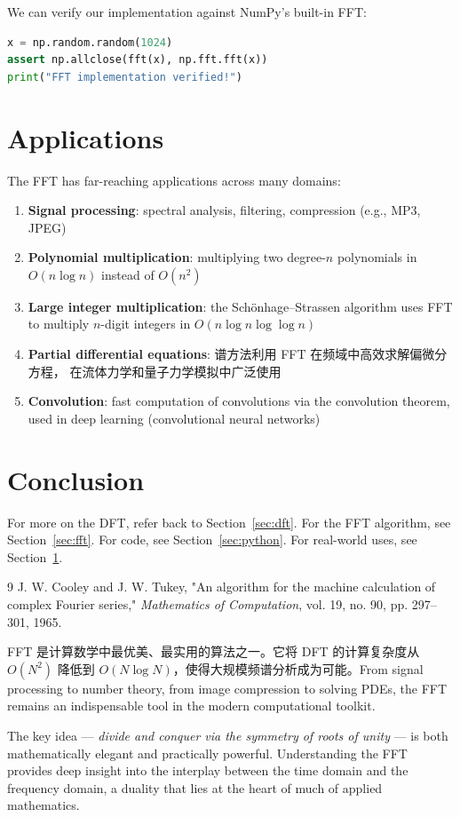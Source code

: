 \documentclass[12pt]{article}
\begin{document}
We can verify our implementation against NumPy's built-in FFT:

\begin{lstlisting}[language=Python, caption={Verification against NumPy}]
x = np.random.random(1024)
assert np.allclose(fft(x), np.fft.fft(x))
print("FFT implementation verified!")
\end{lstlisting}

\section{Applications}\label{sec:apps}

The FFT has far-reaching applications across many domains:

\begin{enumerate}
  \item \textbf{Signal processing}: spectral analysis, filtering, compression (e.g., MP3, JPEG)
  \item \textbf{Polynomial multiplication}: multiplying two degree-$n$ polynomials in $O(n \log n)$
        instead of $O(n^2)$
  \item \textbf{Large integer multiplication}: the Schönhage--Strassen algorithm uses FFT to
        multiply $n$-digit integers in $O(n \log n \log \log n)$
  \item \textbf{Partial differential equations}: 谱方法利用 FFT 在频域中高效求解偏微分方程，
        在流体力学和量子力学模拟中广泛使用
  \item \textbf{Convolution}: fast computation of convolutions via the convolution theorem,
        used in deep learning (convolutional neural networks)
\end{enumerate}

\section{Conclusion}

For more on the DFT, refer back to Section~\ref{sec:dft}. For the FFT algorithm, see Section~\ref{sec:fft}. For code, see Section~\ref{sec:python}. For real-world uses, see Section~\ref{sec:apps}.

\begin{thebibliography}{9}
J. W. Cooley and J. W. Tukey, "An algorithm for the machine calculation of complex Fourier series," \textit{Mathematics of Computation}, vol. 19, no. 90, pp. 297--301, 1965.
\end{thebibliography}

FFT 是计算数学中最优美、最实用的算法之一。它将 DFT 的计算复杂度从 $O(N^2)$ 降低到
$O(N \log N)$，使得大规模频谱分析成为可能。From signal processing to number theory,
from image compression to solving PDEs, the FFT remains an indispensable tool in the
modern computational toolkit.

The key idea --- \emph{divide and conquer via the symmetry of roots of unity} --- is
both mathematically elegant and practically powerful. Understanding the FFT provides
deep insight into the interplay between the time domain and the frequency domain, a
duality that lies at the heart of much of applied mathematics.
\end{document}

